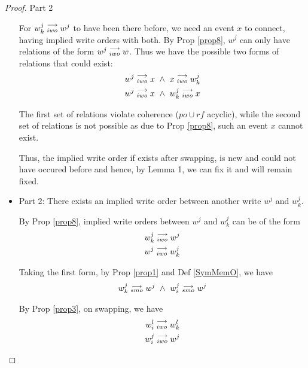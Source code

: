 \begin{proof}{Part 2}
\begin{itemize}
                        For $w_k^j\stackrel{\longrightarrow}{_{iwo}}w^j$ to have been there before, we need an event $x$ to connect, having implied write orders with both. By Prop \ref{prop8}, $w^j$ can only have relations of the form  $w^j\stackrel{\longrightarrow}{_{iwo}}w$. Thus we have the possible two forms of relations that could exist:
                        \begin{align*}
                            \reln{w^j}{iwo}{x} \ \wedge \ \reln{x}{iwo}{w_k^j} \\ 
                            \reln{w^j}{iwo}{x} \ \wedge \ \reln{w_k^j}{iwo}{x}
                        \end{align*}

                        The first set of relations violate coherence ($po \cup rf$ acyclic), while the second set of relations is not possible as due to Prop \ref{prop8}, such an event $x$ cannot exist. 

                        Thus, the implied write order if exists after swapping, is new and could not have occured before and hence, by Lemma 1, we can fix it and will remain fixed. 

                    \item Part 2: There exists an implied write order between another write $w^j$ and $w_k^j$.
                    
                        By Prop \ref{prop8}, implied write orders between $w^j$ and $w_k^j$ can be of the form
                        \begin{align*}
                            w_k^j\stackrel{\longrightarrow}{_{iwo}}w^j \\ 
                            w^j\stackrel{\longrightarrow}{_{iwo}}w_k^j
                        \end{align*} 

                        Taking the first form, by Prop \ref{prop1} and Def \ref{SymMemO}, we have 
                        \begin{align*}
                            \reln{w_k^j}{smo}{w^j} \ \wedge \ \reln{w_i^j}{smo}{w^j}
                        \end{align*}

                        By Prop \ref{prop3}, on swapping, we have 
                        \begin{align*}
                            w_i^l\stackrel{\longrightarrow}{_{iwo}}w_k^l \\ 
                            w_i^j\stackrel{\longrightarrow}{_{iwo}}w^j                         
                        \end{align*}


\end{itemize}
\end{proof}
